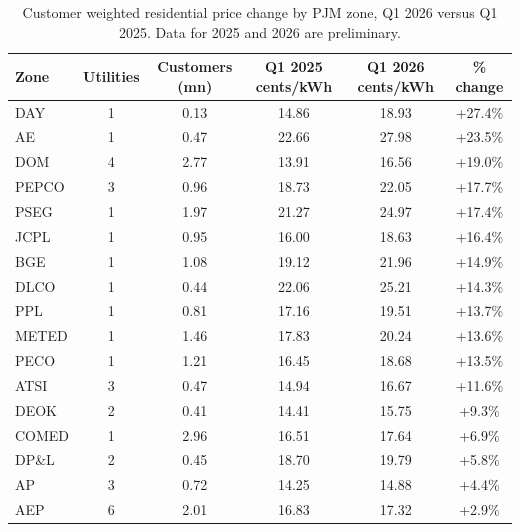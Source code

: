 \begin{table}[H]
\centering
\caption{Customer weighted residential price change by PJM zone, Q1 2026 versus Q1 2025. Data for 2025 and 2026 are preliminary.}
\label{tab:pjm_zone_change}
\begin{tabular}{l c c c c c}
\toprule
Zone & Utilities & Customers (mn) & Q1 2025 cents/kWh & Q1 2026 cents/kWh & \% change \\
\midrule
DAY & 1 & 0.13 & 14.86 & 18.93 & +27.4\% \\
AE & 1 & 0.47 & 22.66 & 27.98 & +23.5\% \\
DOM & 4 & 2.77 & 13.91 & 16.56 & +19.0\% \\
PEPCO & 3 & 0.96 & 18.73 & 22.05 & +17.7\% \\
PSEG & 1 & 1.97 & 21.27 & 24.97 & +17.4\% \\
JCPL & 1 & 0.95 & 16.00 & 18.63 & +16.4\% \\
BGE & 1 & 1.08 & 19.12 & 21.96 & +14.9\% \\
DLCO & 1 & 0.44 & 22.06 & 25.21 & +14.3\% \\
PPL & 1 & 0.81 & 17.16 & 19.51 & +13.7\% \\
METED & 1 & 1.46 & 17.83 & 20.24 & +13.6\% \\
PECO & 1 & 1.21 & 16.45 & 18.68 & +13.5\% \\
ATSI & 3 & 0.47 & 14.94 & 16.67 & +11.6\% \\
DEOK & 2 & 0.41 & 14.41 & 15.75 & +9.3\% \\
COMED & 1 & 2.96 & 16.51 & 17.64 & +6.9\% \\
DP\&L & 2 & 0.45 & 18.70 & 19.79 & +5.8\% \\
AP & 3 & 0.72 & 14.25 & 14.88 & +4.4\% \\
AEP & 6 & 2.01 & 16.83 & 17.32 & +2.9\% \\
\bottomrule
\end{tabular}
\end{table}
